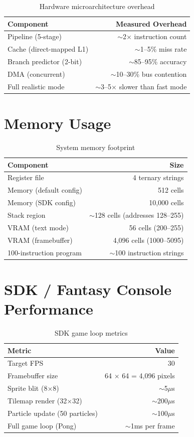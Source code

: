 \documentclass[10pt,a4paper,twoside]{book}
\begin{document}
\begin{table}[H]
\centering
\caption{Hardware microarchitecture overhead}
\label{app:hwperf}
\begin{tabular}{lr}
\toprule
Component & Measured Overhead \\
\midrule
Pipeline (5-stage) & $\sim$2$\times$ instruction count \\
Cache (direct-mapped L1) & $\sim$1--5\% miss rate \\
Branch predictor (2-bit) & $\sim$85--95\% accuracy \\
DMA (concurrent) & $\sim$10--30\% bus contention \\
Full realistic mode & $\sim$3--5$\times$ slower than fast mode \\
\bottomrule
\end{tabular}
\end{table}

\section{Memory Usage}

\begin{table}[H]
\centering
\caption{System memory footprint}
\label{app:memusage}
\begin{tabular}{lr}
\toprule
Component & Size \\
\midrule
Register file & 4 ternary strings \\
Memory (default config) & 512 cells \\
Memory (SDK config) & 10,000 cells \\
Stack region & $\sim$128 cells (addresses 128--255) \\
VRAM (text mode) & 56 cells (200--255) \\
VRAM (framebuffer) & 4,096 cells (1000--5095) \\
100-instruction program & $\sim$100 instruction strings \\
\bottomrule
\end{tabular}
\end{table}

\section{SDK / Fantasy Console Performance}

\begin{table}[H]
\centering
\caption{SDK game loop metrics}
\label{app:sdkperf}
\begin{tabular}{lr}
\toprule
Metric & Value \\
\midrule
Target FPS & 30 \\
Framebuffer size & 64 $\times$ 64 = 4,096 pixels \\
Sprite blit (8$\times$8) & $\sim$5$\mu$s \\
Tilemap render (32$\times$32) & $\sim$200$\mu$s \\
Particle update (50 particles) & $\sim$100$\mu$s \\
Full game loop (Pong) & $\sim$1ms per frame \\
\bottomrule
\end{tabular}
\end{table}
\end{document}
